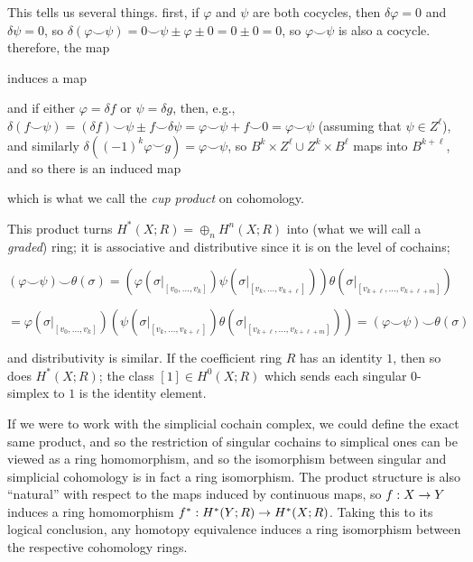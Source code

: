 \ssk

This tells us several things. first, if $\varphi$ and $\psi$ are both cocycles, then 
$\delta\varphi = 0$ and $\delta\psi = 0$, so $\delta(\varphi\smile\psi) = 0\smile\psi \pm \varphi \pm 0 = 0\pm 0 =0$, 
so $\varphi\smile\psi$ is also a cocycle. therefore, the map

\ssk


\ssk

induces a map 

\ssk


\ssk

and if either $\varphi=\delta f$ or $\psi=\delta g$, then, e.g., 
$\delta(f\smile\psi)= (\delta f)\smile\psi \pm f\smile\delta\psi = \varphi\smile\psi + f\smile 0 = \varphi\smile\psi$
(assuming that $\psi\in Z^\ell$), and similarly $\delta((-1)^k\varphi\smile g) = \varphi\smile\psi$, so 
$B^k\times Z^\ell \cup Z^k\times B^\ell$ maps into $B^{k+\ell}$, and so there is an induced map

\ssk


\ssk

which is what we call the {\it cup product} on cohomology.

\ssk

This product turns $H^*(X;R) = \oplus_n H^n(X;R)$ into (what we will call a {\it graded}) ring;
it is associative and distributive since it is on the level of cochains;

\ssk

$(\varphi\smile\psi)\smile\theta(\sigma) 
= (\varphi(\sigma|_{[v_0,\ldots,v_k]})\psi(\sigma|_{[v_k,\ldots,v_{k+\ell}]}))\theta(\sigma|_{[v_{k+\ell},\ldots,v_{k+\ell+m}]})$

$= \varphi(\sigma|_{[v_0,\ldots,v_k]})(\psi(\sigma|_{[v_k,\ldots,v_{k+\ell}]})\theta(\sigma|_{[v_{k+\ell},\ldots,v_{k+\ell+m}]}))
=(\varphi\smile\psi)\smile\theta(\sigma)$

\ssk

and distributivity is similar. If the coefficient ring $R$ has an identity $1$, then so does $H^*(X;R)$; the
class $[1]\in H^0(X;R)$ which sends each singular $0$-simplex to $1$ is the identity element.

\vfill
\eject

If we were to work with the simplicial cochain complex, we could define the exact same product, and so the
restriction of singular cochains to simplical ones can be viewed as a ring homomorphism, and so the
isomorphism between singular and simplicial cohomology is in fact a ring isomorphism. The product structure
is also ``natural'' with respect to the maps induced by continuous maps,
so $f:X\rightarrow Y$ induces a ring homomorphism $f^*:H^*(Y;R)\rightarrow H^*(X;R)$. Taking this to its logical conclusion,
any homotopy equivalence induces a ring isomorphism between the respective cohomology rings.

